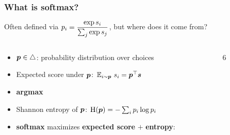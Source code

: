 \begin{frame}[t,fragile]%
\frametitle{What is softmax?}%
\centering \fontsize{12pt}{15}\selectfont
Often defined via $\displaystyle
{p}_i = \frac{\exp s_i}{\sum_j \exp s_j}$,\quad
but where does it come from?%
\begin{columns}
\begin{column}{.62\textwidth}
\centering
\begin{itemize}
\item<2->[] $\boldsymbol{p} \in \triangle$: probability distribution over choices
\item<6->[] Expected score under $\boldsymbol{p}$: $\mathbb{E}_{i \sim \boldsymbol{p}}~s_i =\boldsymbol{p}^\top\boldsymbol{s}$
\item<7->[] \textbf{argmax} 
\item<9->[] Shannon entropy of $\boldsymbol{p}$: $\operatorname{H}(\boldsymbol{p}) = -\sum_i p_i \log p_i$
\item<10->[] \textbf{softmax} maximizes \textbf{expected score} $+$ \textbf{entropy}:
\end{itemize}
\end{column}%
\begin{column}{.33\textwidth}
\begin{overlayarea}{\textwidth}{6\baselineskip}
\centering
{}%
\end{overlayarea}
\end{column}
\end{columns}
\end{frame}
